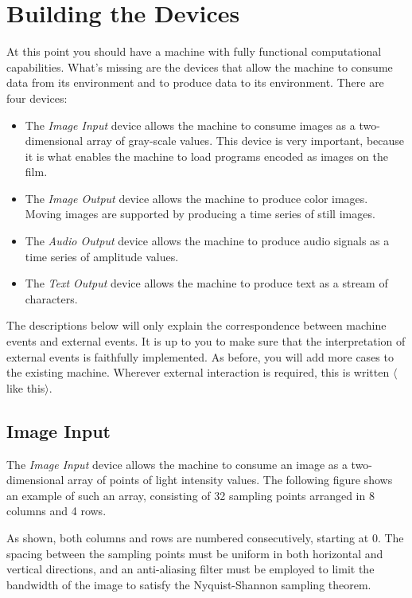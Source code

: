 \documentclass[a4paper,12pt]{article}
\newcommand{\deviceio}[1]{$\langle$#1$\rangle$}
\begin{document}
\section{Building the Devices}
\label{sec:building-devices}

At this point you should have a machine with fully functional computational capabilities.
What's missing are the devices that allow the machine to consume data from its environment and to produce data to its environment.
There are four devices:
\begin{itemize}
\item The \emph{Image Input} device allows the machine to consume images as a two-dimensional array of gray-scale values.
  This device is very important, because it is what enables the machine to load programs encoded as images on the film.
\item The \emph{Image Output} device allows the machine to produce color images.
  Moving images are supported by producing a time series of still images.
\item The \emph{Audio Output} device allows the machine to produce audio signals as a time series of amplitude values.
\item The \emph{Text Output} device allows the machine to produce text as a stream of characters.
\end{itemize}
The descriptions below will only explain the correspondence between machine events and external events.
It is up to you to make sure that the interpretation of external events is faithfully implemented.
As before, you will add more cases to the existing machine.
Wherever external interaction is required, this is written \deviceio{like this}.

\subsection{Image Input}

The \emph{Image Input} device allows the machine to consume an image as a two-dimensional array of points of light intensity values.
The following figure shows an example of such an array, consisting of 32 sampling points arranged in 8 columns and 4 rows.
\begin{center}
\end{center}
As shown, both columns and rows are numbered consecutively, starting at 0.
The spacing between the sampling points must be uniform in both horizontal and vertical directions, and an anti-aliasing filter must be employed to limit the bandwidth of the image to satisfy the Nyquist-Shannon sampling theorem.
\end{document}
